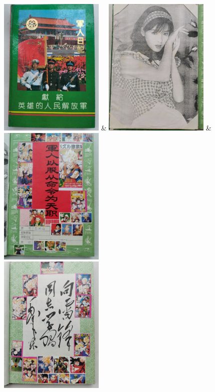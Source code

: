 \begingroup
  \centering
  \begin{tblr}{}
    \includegraphics[width=5cm]{pic/军人日记-1.jpg}
      & \includegraphics[width=5cm]{pic/军人日记-2.jpg}
      & \includegraphics[width=5cm]{pic/军人日记-3.jpg} \\
    \includegraphics[width=5cm]{pic/军人日记-4.jpg}

\end{tblr}
